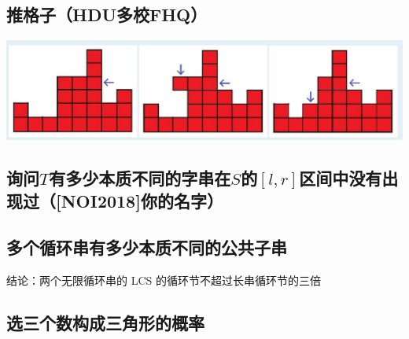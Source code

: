 \documentclass[twoside,a4paper]{article}
\begin{document}
\subsection{推格子（HDU多校FHQ）}
\includegraphics[width=15cm]{习题整理/推格子.jpg}


\subsection{询问$T$有多少本质不同的字串在$S$的$[l,r]$区间中没有出现过（[NOI2018]你的名字）}



\subsection{多个循环串有多少本质不同的公共子串}
结论：两个无限循环串的 LCS 的循环节不超过长串循环节的三倍


\subsection{选三个数构成三角形的概率}

\end{document}
